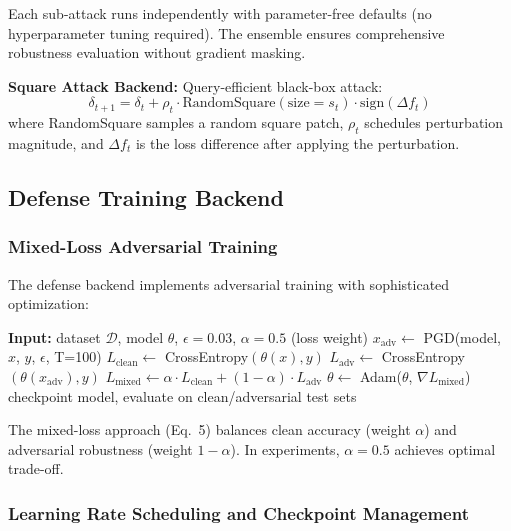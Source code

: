 \documentclass[10pt,conference]{IEEEtran}
\begin{document}
Each sub-attack runs independently with parameter-free defaults (no hyperparameter tuning required). The ensemble ensures comprehensive robustness evaluation without gradient masking.

\textbf{Square Attack Backend:} Query-efficient black-box attack:
\begin{equation}
\delta_{t+1} = \delta_t + \rho_t \cdot \text{RandomSquare}(\text{size}=s_t) \cdot \text{sign}(\Delta f_t)
\end{equation}
where RandomSquare samples a random square patch, $\rho_t$ schedules perturbation magnitude, and $\Delta f_t$ is the loss difference after applying the perturbation.

\subsection{Defense Training Backend}

\subsubsection{Mixed-Loss Adversarial Training}

The defense backend implements adversarial training with sophisticated optimization:

\begin{algorithm}[h]
\caption{Mixed-Loss Adversarial Training Pipeline}
\begin{algorithmic}[1]
\STATE \textbf{Input:} dataset $\mathcal{D}$, model $\theta$, $\epsilon=0.03$, $\alpha=0.5$ (loss weight)
\STATE $x_{\text{adv}} \leftarrow$ PGD(model, $x$, $y$, $\epsilon$, T=100)
\STATE $L_{\text{clean}} \leftarrow$ CrossEntropy$(\theta(x), y)$
\STATE $L_{\text{adv}} \leftarrow$ CrossEntropy$(\theta(x_{\text{adv}}), y)$
\STATE $L_{\text{mixed}} \leftarrow \alpha \cdot L_{\text{clean}} + (1-\alpha) \cdot L_{\text{adv}}$
\STATE $\theta \leftarrow$ Adam($\theta$, $\nabla L_{\text{mixed}}$)
\ENDFOR
\STATE checkpoint model, evaluate on clean/adversarial test sets
\ENDFOR
\end{algorithmic}
\end{algorithm}

The mixed-loss approach (Eq.~5) balances clean accuracy (weight $\alpha$) and adversarial robustness (weight $1-\alpha$). In experiments, $\alpha=0.5$ achieves optimal trade-off.

\subsubsection{Learning Rate Scheduling and Checkpoint Management}
\end{document}
